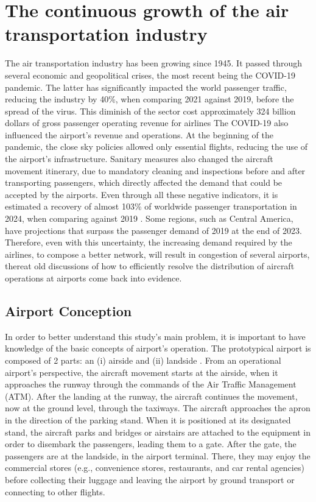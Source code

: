 
\label{section:Introduction}

\section{The continuous growth of the air transportation industry}%

The air transportation industry has been growing since 1945. It passed through several economic and geopolitical crises, the most recent being the COVID-19 pandemic. The latter has significantly impacted the world passenger traffic, reducing the industry by 40\%, when comparing 2021 against 2019, before the spread of the virus. This diminish of the sector cost approximately 324 billion dollars of gross passenger operating revenue for airlines \cite{ICAOEconomicImpact} The COVID-19 also influenced the airport's revenue and operations. At the beginning of the pandemic, the close sky policies allowed only essential flights, reducing the use of the airport's infrastructure. Sanitary measures also changed the aircraft movement itinerary, due to mandatory cleaning and inspections before and after transporting passengers, which directly affected the demand that could be accepted by the airports. Even through all these negative indicators, it is estimated a recovery of almost 103\% of worldwide passenger transportation in 2024, when comparing against 2019 \cite{IATA2024}. Some regions, such as Central America, have projections that surpass the passenger demand of 2019 at the end of 2023. Therefore, even with this uncertainty, the increasing demand required by the airlines, to compose a better network, will result in congestion of several airports, thereat old discussions of how to efficiently resolve the distribution of aircraft operations at airports come back into evidence.

\subsection{Airport Conception}

In order to better understand this study's main problem, it is important to have knowledge of the basic concepts of airport’s operation. The prototypical airport is composed of 2 parts: an (i) airside and (ii) landside \cite{Lance2009}. From an operational airport’s perspective, the aircraft movement starts at the airside, when it approaches the runway through the commands of the Air Traffic Management (ATM). After the landing at the runway, the aircraft continues the movement, now at the ground level, through the taxiways. The aircraft approaches the apron in the direction of the parking stand. When it is positioned at its designated stand, the aircraft parks and bridges or airstairs are attached to the equipment in order to disembark the passengers, leading them to a gate. After the gate, the passengers are at the landside, in the airport terminal. There, they may enjoy the commercial stores (e.g., convenience stores, restaurants, and car rental agencies) before collecting their luggage and leaving the airport by ground transport or connecting to other flights. 

